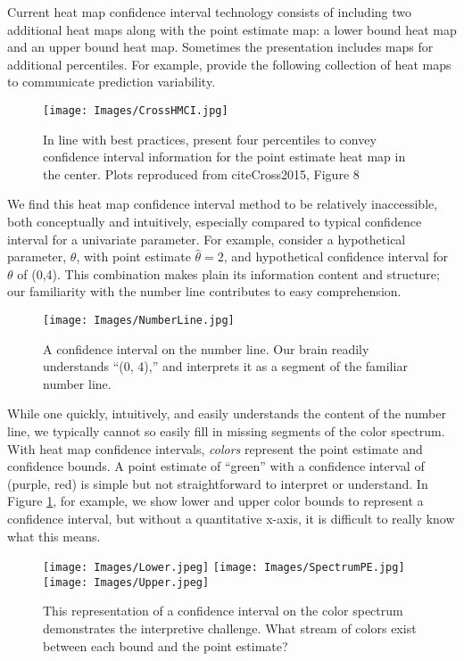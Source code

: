 Current heat map confidence interval technology consists of including two additional heat maps along with the point estimate map: a lower bound heat map and an upper bound heat map. Sometimes the presentation includes maps for additional percentiles. For example, \cite{Cross2015} provide the following collection of heat maps to communicate prediction variability.
  \begin{figure}[H]
	\texttt{[image: Images/CrossHMCI.jpg]}
	\caption{In line with best practices, \cite{Cross2015} present four percentiles to convey confidence interval information for the point estimate heat map in the center. Plots reproduced from cite{Cross2015}, Figure 8}
	\end{figure}
We find this heat map confidence interval method to be relatively inaccessible, both conceptually and intuitively, especially compared to typical confidence interval for a univariate parameter. For example, consider a hypothetical parameter, $\theta$, with point estimate $\hat{\theta} = 2$, and hypothetical confidence interval for $\theta$ of (0,4). This combination makes plain its information content and structure; our familiarity with the number line contributes to easy comprehension.
  \begin{figure}[H]
  \centering
	\texttt{[image: Images/NumberLine.jpg]}
	\caption{A confidence interval on the number line. Our brain readily understands ``(0, 4),'' and interprets it as a segment of the familiar number line. } %
	\end{figure}
While one quickly, intuitively, and easily understands the content of the number line, we typically cannot so easily fill in missing segments of the color spectrum. With heat map confidence intervals, {\it colors} represent the point estimate and confidence bounds. A point estimate of ``green'' with a confidence interval of (purple, red) is simple but not straightforward to interpret or understand. In Figure \ref{fig:colorCI}, for example, we show lower and upper color bounds to represent a confidence interval, but without a quantitative x-axis, it is difficult to really know what this means.
  \begin{figure}[H]
  \centering
	\texttt{[image: Images/Lower.jpeg]}
	\texttt{[image: Images/SpectrumPE.jpg]}
	\texttt{[image: Images/Upper.jpeg]}
	\caption{This representation of a confidence interval on the color spectrum demonstrates the interpretive challenge. What stream of colors exist between each bound and the point estimate?}
	\label{fig:colorCI}
	\end{figure}

